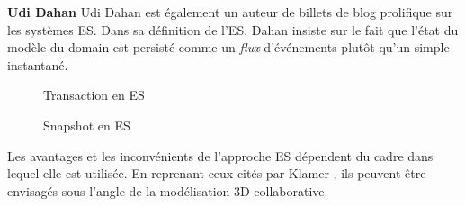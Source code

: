 \textbf{Udi Dahan} Udi Dahan est également un auteur de billets de blog 
prolifique sur les systèmes \gls{ES}. Dans sa définition de l'\gls{ES}, Dahan 
insiste sur le fait que \og l'état du modèle du domain est persisté comme un 
\textit{flux} d'événements plutôt qu'un simple instantané\fg{}.


%
	\begin{figure}[!h]
		
		\centering
		\noindent
	
		\caption{Transaction en \gls{ES}}
		\label{fig:es-transaction}
	\end{figure}

	
	\begin{figure}[t]
		\centering
		
		\caption{Snapshot en \gls{ES}}
	\end{figure}

Les avantages et les inconvénients de l'approche \gls{ES} dépendent du
cadre dans lequel elle est utilisée. En reprenant ceux cités par Klamer 
\cite{Klamer2013a}, ils peuvent être envisagés sous l'angle de la modélisation 
\gls{3D} 
collaborative.

